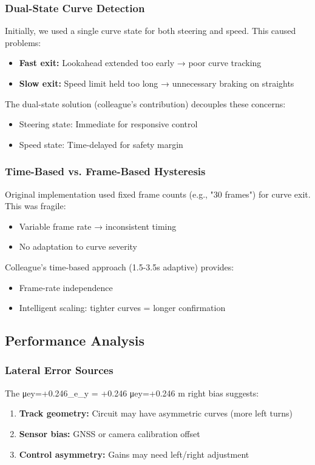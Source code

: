 \documentclass[12pt]{article}
\begin{document}
\subsubsection{Dual-State Curve Detection}
Initially, we used a single curve state for both steering and speed. This caused problems:
\begin{itemize}
\item \textbf{Fast exit:} Lookahead extended too early → poor curve tracking
\item \textbf{Slow exit:} Speed limit held too long → unnecessary braking on straights
\end{itemize}
The dual-state solution (colleague's contribution) decouples these concerns:
\begin{itemize}
\item Steering state: Immediate for responsive control
\item Speed state: Time-delayed for safety margin
\end{itemize}
\subsubsection{Time-Based vs. Frame-Based Hysteresis}
Original implementation used fixed frame counts (e.g., "30 frames") for curve exit. This was fragile:
\begin{itemize}
\item Variable frame rate → inconsistent timing
\item No adaptation to curve severity
\end{itemize}
Colleague's time-based approach (1.5-3.5s adaptive) provides:
\begin{itemize}
\item Frame-rate independence
\item Intelligent scaling: tighter curves = longer confirmation
\end{itemize}
\subsection{Performance Analysis}
\subsubsection{Lateral Error Sources}
The μey=+0.246\mu_{e_y} = +0.246
μey​​=+0.246 m right bias suggests:
\begin{enumerate}
    \item \textbf{Track geometry:} Circuit may have asymmetric curves (more left turns)
    \item \textbf{Sensor bias:} GNSS or camera calibration offset
    \item \textbf{Control asymmetry:} Gains may need left/right adjustment
\end{enumerate}
\end{document}
